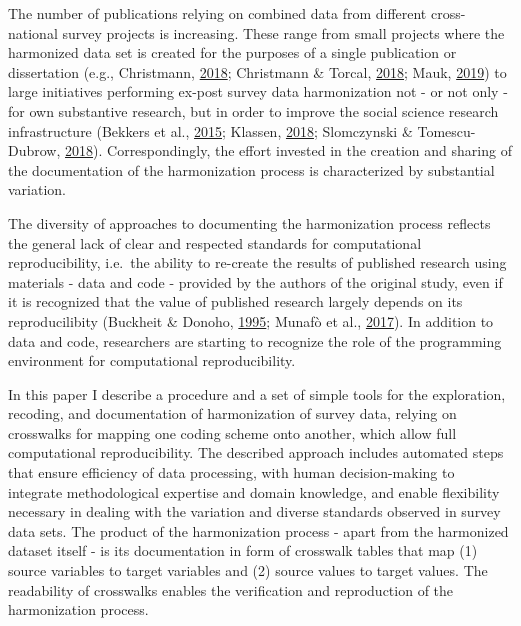 \documentclass[12pt,]{article}
\begin{document}
The number of publications relying on combined data from different cross-national survey projects is increasing. These range from small projects where the harmonized data set is created for the purposes of a single publication or dissertation (e.g., Christmann, \protect\hyperlink{ref-Christmann2018}{2018}; Christmann \& Torcal, \protect\hyperlink{ref-Christmann2018a}{2018}; Mauk, \protect\hyperlink{ref-Mauk2019}{2019}) to large initiatives performing ex-post survey data harmonization not - or not only - for own substantive research, but in order to improve the social science research infrastructure (Bekkers et al., \protect\hyperlink{ref-Bekkers2015}{2015}; Klassen, \protect\hyperlink{ref-Klassen2018}{2018}; Slomczynski \& Tomescu-Dubrow, \protect\hyperlink{ref-Slomczynski2018}{2018}). Correspondingly, the effort invested in the creation and sharing of the documentation of the harmonization process is characterized by substantial variation.

The diversity of approaches to documenting the harmonization process reflects the general lack of clear and respected standards for computational reproducibility, i.e.~the ability to re-create the results of published research using materials - data and code - provided by the authors of the original study, even if it is recognized that the value of published research largely depends on its reproducilibity (Buckheit \& Donoho, \protect\hyperlink{ref-Buckheit1995}{1995}; Munafò et al., \protect\hyperlink{ref-Munafo2017}{2017}). In addition to data and code, researchers are starting to recognize the role of the programming environment for computational reproducibility.

In this paper I describe a procedure and a set of simple tools for the exploration, recoding, and documentation of harmonization of survey data, relying on crosswalks for mapping one coding scheme onto another, which allow full computational reproducibility. The described approach includes automated steps that ensure efficiency of data processing, with human decision-making to integrate methodological expertise and domain knowledge, and enable flexibility necessary in dealing with the variation and diverse standards observed in survey data sets. The product of the harmonization process - apart from the harmonized dataset itself - is its documentation in form of crosswalk tables that map (1) source variables to target variables and (2) source values to target values. The readability of crosswalks enables the verification and reproduction of the harmonization process.
\end{document}
